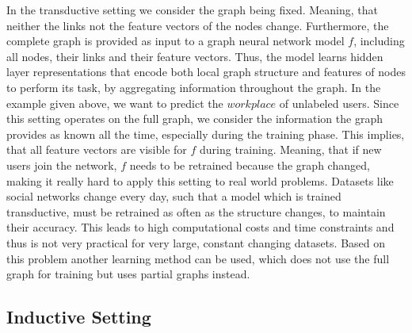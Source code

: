       In the transductive setting \cite{kipf2017semisupervised} we consider the graph being fixed.
      Meaning, that neither the links not the feature vectors of the nodes change.
      Furthermore, the complete graph is provided as input to a graph neural network model $f$, including all nodes, their links and their feature vectors.
      Thus, the model learns hidden layer representations that encode both local graph structure and features of nodes to perform its task, by aggregating information throughout the graph.
      In the example given above, we want to predict the $workplace$ of unlabeled users.
      Since this setting operates on the full graph, we consider the information the graph provides as known all the time, especially during the training phase.
      This implies, that all feature vectors are visible for $f$ during training.
      Meaning, that if new users join the network, $f$ needs to be retrained because the graph changed, making it really hard to apply this setting to real world problems.
      Datasets like social networks change every day, such that a model which is trained transductive, must be retrained as often as the structure changes, to maintain their accuracy.
      This leads to high computational costs and time constraints and thus is not very practical for very large, constant changing datasets.
      Based on this problem another learning method can be used, which does not use the full graph for training but uses partial graphs instead.

    \subsection*{Inductive Setting}

